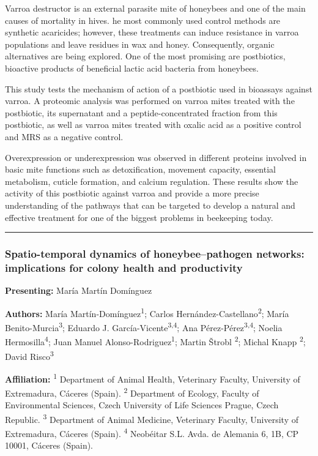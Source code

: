 \documentclass[
  letterpaper,
  DIV=11,
  numbers=noendperiod]{scrartcl}
\begin{document}
Varroa destructor is an external parasite mite of honeybees and one of
the main causes of mortality in hives. he most commonly used control
methods are synthetic acaricides; however, these treatments can induce
resistance in varroa populations and leave residues in wax and honey.
Consequently, organic alternatives are being explored. One of the most
promising are postbiotics, bioactive products of beneficial lactic acid
bacteria from honeybees.

This study tests the mechanism of action of a postbiotic used in
bioassays against varroa. A proteomic analysis was performed on varroa
mites treated with the postbiotic, its supernatant and a
peptide-concentrated fraction from this postbiotic, as well as varroa
mites treated with oxalic acid as a positive control and MRS as a
negative control.

Overexpression or underexpression was observed in different proteins
involved in basic mite functions such as detoxification, movement
capacity, essential metabolism, cuticle formation, and calcium
regulation. These results show the activity of this postbiotic against
varroa and provide a more precise understanding of the pathways that can
be targeted to develop a natural and effective treatment for one of the
biggest problems in beekeeping today.

\begin{center}\rule{0.5\linewidth}{0.5pt}\end{center}

\subsubsection{Spatio-temporal dynamics of honeybee--pathogen networks:
implications for colony health and
productivity}\label{spatio-temporal-dynamics-of-honeybeepathogen-networks-implications-for-colony-health-and-productivity}

\textbf{Presenting:} María Martín Domínguez

\textbf{Authors:} María Martín-Domínguez\textsuperscript{1}; Carlos
Hernández-Castellano\textsuperscript{2}; María
Benito-Murcia\textsuperscript{3}; Eduardo J.
García-Vicente\textsuperscript{3,4}; Ana
Pérez-Pérez\textsuperscript{3,4}; Noelia Hermosilla\textsuperscript{4};
Juan Manuel Alonso-Rodriguez\textsuperscript{1}; Martin Štrobl
\textsuperscript{2}; Michal Knapp \textsuperscript{2}; David
Risco\textsuperscript{3}

\textbf{Affiliation:} \textsuperscript{1} Department of Animal Health,
Veterinary Faculty, University of Extremadura, Cáceres (Spain).
\textsuperscript{2} Department of Ecology, Faculty of Environmental
Sciences, Czech University of Life Sciences Prague, Czech Republic.
\textsuperscript{3} Department of Animal Medicine, Veterinary Faculty,
University of Extremadura, Cáceres (Spain). \textsuperscript{4}
Neobéitar S.L. Avda. de Alemania 6, 1B, CP 10001, Cáceres (Spain).
\end{document}
